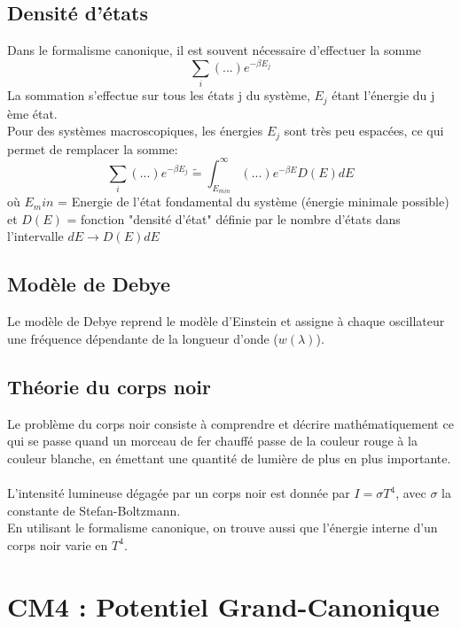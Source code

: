 \documentclass{article}
\begin{document}
    \subsection{Densité d'états}
        Dans le formalisme canonique, il est souvent nécessaire d'effectuer la somme
        $$
        \sum_i (...) e^{-\beta E_j}
        $$
        La sommation s’effectue sur tous les états j du système, $E_j$ étant l’énergie du j ème état.\\
        Pour des systèmes macroscopiques, les énergies $E_j$ sont très peu espacées, ce qui permet de remplacer la somme:
        $$
        \sum_i (...) e^{-\beta E_j} \tilde = \int_{E_{min}}^\infty (...) e^{-\beta E} D(E) dE
        $$
        où $E_min$ = Energie de l’état fondamental du système (énergie minimale possible) et
        $D(E)$ = fonction "densité d’état" définie par le nombre d’états dans l’intervalle $dE \rightarrow D(E)dE$

    \subsection{Modèle de Debye}
        Le modèle de Debye reprend le modèle d'Einstein et assigne à chaque oscillateur une fréquence dépendante de la longueur d'onde ($w(\lambda)$).
    
    \subsection{Théorie du corps noir}
        Le problème du corps noir consiste à comprendre et décrire mathématiquement ce qui se passe quand un morceau de fer chauffé passe de la couleur rouge à la couleur blanche, en émettant une quantité de lumière de plus en plus importante.\\\\
        L'intensité lumineuse dégagée par un corps noir est donnée par $I = \sigma T^4$, avec $\sigma$ la constante de Stefan-Boltzmann.\\
        En utilisant le formalisme canonique, on trouve aussi que l'énergie interne d'un corps noir varie en $T^4$.
\pagebreak
\section{CM4 : Potentiel Grand-Canonique}
\end{document}
